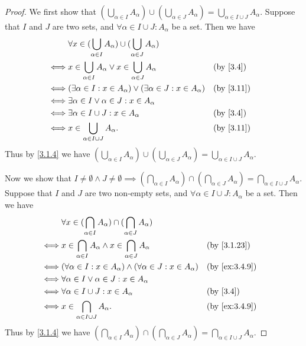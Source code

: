 \begin{proof}
  We first show that \((\bigcup_{\alpha \in I} A_{\alpha}) \cup (\bigcup_{\alpha \in J} A_{\alpha}) = \bigcup_{\alpha \in I \cup J} A_{\alpha}\).
  Suppose that \(I\) and \(J\) are two sets, and \(\forall \alpha \in I \cup J : A_{\alpha}\) be a set.
  Then we have
  \begin{align*}
         & \forall x \in (\bigcup_{\alpha \in I} A_{\alpha}) \cup (\bigcup_{\alpha \in J} A_{\alpha})                              \\
    \iff & x \in \bigcup_{\alpha \in I} A_{\alpha} \lor x \in \bigcup_{\alpha \in J} A_{\alpha}       &  & \text{(by \cref{3.4})}  \\
    \iff & (\exists \alpha \in I : x \in A_{\alpha}) \lor (\exists \alpha \in J : x \in A_{\alpha})   &  & \text{(by \cref{3.11})} \\
    \iff & \exists \alpha \in I \lor \alpha \in J : x \in A_{\alpha}                                                               \\
    \iff & \exists \alpha \in I \cup J : x \in A_{\alpha}                                             &  & \text{(by \cref{3.4})}  \\
    \iff & x \in \bigcup_{\alpha \in I \cup J} A_{\alpha}.                                            &  & \text{(by \cref{3.11})}
  \end{align*}
  Thus by \cref{3.1.4} we have \((\bigcup_{\alpha \in I} A_{\alpha}) \cup (\bigcup_{\alpha \in J} A_{\alpha}) = \bigcup_{\alpha \in I \cup J} A_{\alpha}\).

  Now we show that \(I \neq \emptyset \land J \neq \emptyset \implies (\bigcap_{\alpha \in I} A_{\alpha}) \cap (\bigcap_{\alpha \in J} A_{\alpha}) = \bigcap_{\alpha \in I \cup J} A_{\alpha}\).
  Suppose that \(I\) and \(J\) are two non-empty sets, and \(\forall \alpha \in I \cup J : A_{\alpha}\) be a set.
  Then we have
  \begin{align*}
         & \forall x \in (\bigcap_{\alpha \in I} A_{\alpha}) \cap (\bigcap_{\alpha \in J} A_{\alpha})                             \\
    \iff & x \in \bigcap_{\alpha \in I} A_{\alpha} \land x \in \bigcap_{\alpha \in J} A_{\alpha}      &  & \by{3.1.23}            \\
    \iff & (\forall \alpha \in I : x \in A_{\alpha}) \land (\forall \alpha \in J : x \in A_{\alpha})  &  & \by{ex:3.4.9}          \\
    \iff & \forall \alpha \in I \lor \alpha \in J : x \in A_{\alpha}                                                              \\
    \iff & \forall \alpha \in I \cup J : x \in A_{\alpha}                                             &  & \text{(by \cref{3.4})} \\
    \iff & x \in \bigcap_{\alpha \in I \cup J} A_{\alpha}.                                            &  & \by{ex:3.4.9}
  \end{align*}
  Thus by \cref{3.1.4} we have \((\bigcap_{\alpha \in I} A_{\alpha}) \cap (\bigcap_{\alpha \in J} A_{\alpha}) = \bigcap_{\alpha \in I \cup J} A_{\alpha}\).
\end{proof}

